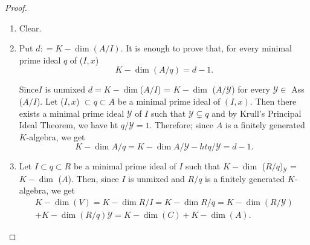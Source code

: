\begin{proof}%
\begin{enumerate}
\item Clear.
\item Put $d:  = K-\dim (A/I)$. It is enough to prove that, for every
  minimal prime ideal $q$ of ($I, x$) 
  $$
  K-\dim (A/q) = d-1.
  $$

  Since\pageoriginale $I$ is unmixed $d=K-\dim$($A/I$) = $K-\dim $ ($A/\mathscr{Y}$)
  for every $\mathscr{Y} \in $ Ass ($A/I$). Let ($I, x$) $
  \subset q \subset A$ be a minimal prime ideal of $(I,x)$. Then there
  exists a minimal prime ideal $\mathscr{Y}$ of $I$ such that
  $\mathscr{Y} \subsetneq q $ and by Krull's Principal Ideal Theorem,
  we have ht $q/ \mathscr{Y}=1$. Therefore; since $A$ is a finitely
  generated $K$-algebra, we get 
  $$
  K-\dim A/q = K-\dim A/\mathscr{Y} - ht q/\mathscr{Y} = d - 1.
  $$
\item Let $I \subset q \subset R$ be a minimal prime ideal of $I$ such
  that $K-\dim$ ($R/q$)$_\mathscr{Y}$ = $K-\dim$ ($A$). Then,  since
  $I$ is unmixed and $R/q$ is a finitely generated $K$-algebra, we get 
  \begin{multline*}
    K-\dim (V) = K-\dim R/I=K-\dim R/q=K-\dim (R/\mathscr{Y})\\
    +K-\dim  (R/q) \mathscr{Y} = K-\dim (C)+K-\dim (A). 
  \end{multline*}
\end{enumerate}
\end{proof}

